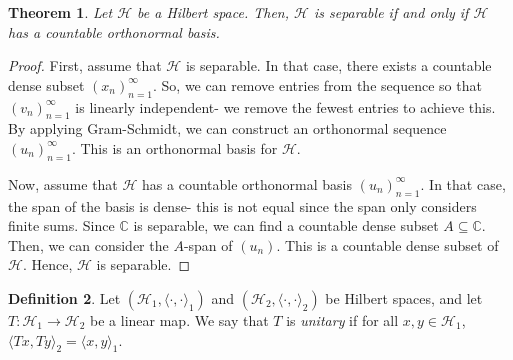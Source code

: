 \documentclass[a4paper, openany]{memoir}
\theoremstyle{definition}
\newtheorem{definition}{Definition}[section]
\theoremstyle{plain}
\newtheorem{theorem}[definition]{Theorem}
\newtheorem{proposition}[definition]{Proposition}
\begin{document}
    \begin{theorem}
        Let $\mathcal{H}$ be a Hilbert space. Then, $\mathcal{H}$ is separable if and only if $\mathcal{H}$ has a countable orthonormal basis.
    \end{theorem}
    \begin{proof}
        First, assume that $\mathcal{H}$ is separable. In that case, there exists a countable dense subset $(x_n)_{n=1}^\infty$. So, we can remove entries from the sequence so that $(v_n)_{n=1}^\infty$ is linearly independent- we remove the fewest entries to achieve this. By applying Gram-Schmidt, we can construct an orthonormal sequence $(u_n)_{n=1}^\infty$. This is an orthonormal basis for $\mathcal{H}$.

        Now, assume that $\mathcal{H}$ has a countable orthonormal basis $(u_n)_{n=1}^\infty$. In that case, the span of the basis is dense- this is not equal since the span only considers finite sums. Since $\mathbb{C}$ is separable, we can find a countable dense subset $A \subseteq \mathbb{C}$. Then, we can consider the $A$-span of $(u_n)$. This is a countable dense subset of $\mathcal{H}$. Hence, $\mathcal{H}$ is separable.
    \end{proof}

    \begin{definition}
        Let $(\mathcal{H}_1, \langle \cdot, \cdot \rangle_1)$ and $(\mathcal{H}_2, \langle \cdot, \cdot \rangle_2)$ be Hilbert spaces, and let $T \colon \mathcal{H}_1 \to \mathcal{H}_2$ be a linear map. We say that $T$ is \emph{unitary} if for all $x, y \in \mathcal{H}_1$, $\langle Tx, Ty \rangle_2 = \langle x, y \rangle_1$.
    \end{definition}

        
\end{document}
